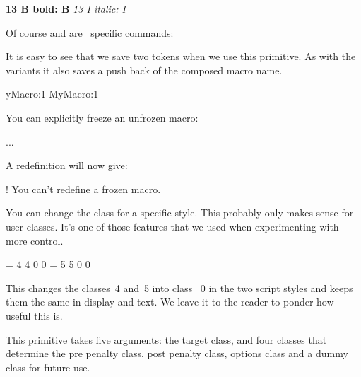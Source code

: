 \startbuffer
{ \bf {} 13 {B   bold}: \meaning B}\crlf
{ \it {} 13 {I italic}: \meaning I}\par
\stopbuffer

\typebuffer

Of course \type {\bf} and \type {\it} are \CONTEXT\ specific commands:

{\tttf \getbuffer}

\stopnewprimitive

\startnewprimitive[title={\prm {letcsname}}]

It is easy to see that we save two tokens when we use this primitive. As with the
 variants it also saves a push back of the composed macro name.

\starttyping
\expandafter\let\csname MyMacro:1\endcsname\relax
              MyMacro:1\endcsname\relax
\stoptyping

\stopnewprimitive

\startnewprimitive[title={\prm {letfrozen}}]

You can explicitly freeze an unfrozen macro:

\starttyping
\def\MyMacro{...}
\MyMacro
\stoptyping

A redefinition will now give:

\starttyping
! You can't redefine a frozen macro.
\stoptyping

\stopnewprimitive

\startnewprimitive[title={\prm {letmathatomrule}}]

You can change the class for a specific style. This probably only makes sense
for user classes. It's one of those features that we used when experimenting
with more control.

\starttyping
{} = 4 4 0 0
 = 5 5 0 0
\stoptyping

This changes the classes~4 and~5 into class~ 0 in the two script styles and keeps
them the same in display and text. We leave it to the reader to ponder how useful
this is.

\stopnewprimitive

\startnewprimitive[title={\prm {letmathparent}}]

This primitive takes five arguments: the target class, and four classes that
determine the pre penalty class, post penalty class, options class and a dummy
class for future use.

\stopnewprimitive

